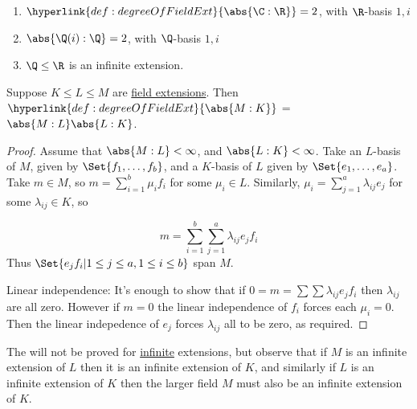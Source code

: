 \documentclass{article}
\begin{document}

\begin{eg}\leavevmode
    \begin{enumerate}[label=(\roman*)]
        \item $\hyperlink{def:degreeOfFieldExt}{\abs{\C:\R}} = 2$, with $\R$-basis $1, i$
        \item $\abs{\Q(i):\Q} = 2$, with $\Q$-basis $1, i$
        \item $\Q \leq \R$ is an infinite extension.
    \end{enumerate}
\end{eg}

\begin{nthm}\label{thm:towerLaw}
    Suppose $K \leq L \leq M$ are \hyperlink{def:fieldExt}{field extensions}. Then $\hyperlink{def:degreeOfFieldExt}{\abs{M:K}}$ = $\abs{M:L}\abs{L:K}$.
\end{nthm}

\begin{proof}
    Assume that $\abs{M:L} < \infty$, and $\abs{L:K} < \infty$.
    Take an $L$-basis of $M$, given by $\Set{f_1, \dotsc, f_b}$, and a $K$-basis of $L$ given by $\Set{e_1, \dotsc, e_a}$.
    Take $m \in M$, so $m = \sum_{i=1}^b \mu_i f_i$ for some $\mu_i \in L$.
    Similarly, $\mu_i = \sum_{j=1}^a \lambda_{ij} e_j$ for some $\lambda_{ij} \in K$, so

    \begin{equation*}
        m = \sum_{i=1}^b \sum_{j=1}^a \lambda_{ij} e_j f_i
    \end{equation*}
    Thus $\Set{e_j f_i | 1 \leq j \leq a, 1 \leq i \leq b}$ span $M$.

    Linear independence:
    It's enough to show that if $0 = m = \sum \sum \lambda_{ij} e_j f_i$ then $\lambda_{ij}$ are all zero.
    However if $m = 0$ the linear independence of $f_i$ forces each $\mu_i = 0$.
    Then the linear indepedence of $e_j$ forces $\lambda_{ij}$ all to be zero, as required.
\end{proof}

The  will not be proved for \hyperlink{def:degreeOfFieldExt}{infinite} extensions, but observe that if $M$ is an infinite extension of $L$ then it is an infinite extension of $K$, and similarly if $L$ is an infinite extension of $K$ then the larger field $M$ must also be an infinite extension of $K$.
\end{document}
